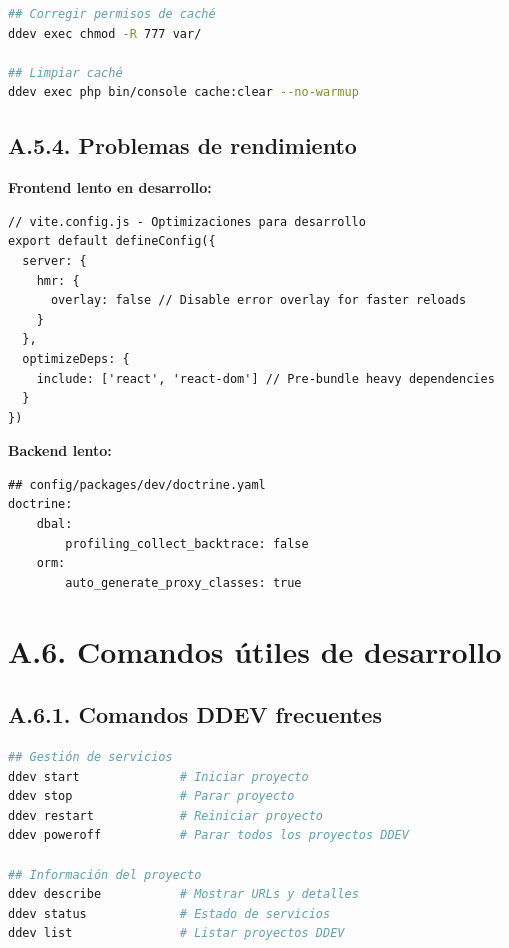 \documentclass[12pt,a4paper,oneside]{report}
\begin{document}
{\begin{lstlisting}[language=bash]
## Corregir permisos de caché
ddev exec chmod -R 777 var/

## Limpiar caché
ddev exec php bin/console cache:clear --no-warmup
\end{lstlisting}

\subsection{A.5.4. Problemas de
rendimiento}\label{a.5.4.-problemas-de-rendimiento}

\textbf{Frontend lento en desarrollo:}

\begin{lstlisting}
// vite.config.js - Optimizaciones para desarrollo
export default defineConfig({
  server: {
    hmr: {
      overlay: false // Disable error overlay for faster reloads
    }
  },
  optimizeDeps: {
    include: ['react', 'react-dom'] // Pre-bundle heavy dependencies
  }
})
\end{lstlisting}

\textbf{Backend lento:}

\begin{lstlisting}
## config/packages/dev/doctrine.yaml
doctrine:
    dbal:
        profiling_collect_backtrace: false
    orm:
        auto_generate_proxy_classes: true
\end{lstlisting}

\section{A.6. Comandos útiles de
desarrollo}\label{a.6.-comandos-uxfatiles-de-desarrollo}

\subsection{A.6.1. Comandos DDEV
frecuentes}\label{a.6.1.-comandos-ddev-frecuentes}

\begin{lstlisting}[language=bash]
## Gestión de servicios
ddev start              # Iniciar proyecto
ddev stop               # Parar proyecto
ddev restart            # Reiniciar proyecto
ddev poweroff           # Parar todos los proyectos DDEV

## Información del proyecto
ddev describe           # Mostrar URLs y detalles
ddev status             # Estado de servicios
ddev list               # Listar proyectos DDEV


\end{lstlisting}}
\end{document}
